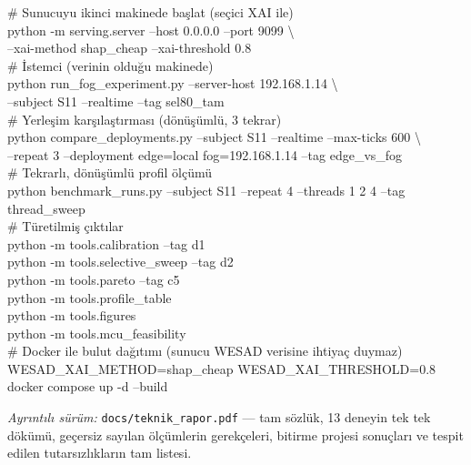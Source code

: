 \documentclass[11pt,a4paper]{article}
\newcommand{\dosya}[1]{\texttt{\footnotesize #1}}
\begin{document}
\begin{tcolorbox}[colback=acikGri,colframe=black!30,boxrule=0.6pt,breakable]
\ttfamily\footnotesize
\# Sunucuyu ikinci makinede başlat (seçici XAI ile)\\
python -m serving.server --host 0.0.0.0 --port 9099 \textbackslash\\
\hspace*{2em}--xai-method shap\_cheap --xai-threshold 0.8\\[0.4em]
\# İstemci (verinin olduğu makinede)\\
python run\_fog\_experiment.py --server-host 192.168.1.14 \textbackslash\\
\hspace*{2em}--subject S11 --realtime --tag sel80\_tam\\[0.4em]
\# Yerleşim karşılaştırması (dönüşümlü, 3 tekrar)\\
python compare\_deployments.py --subject S11 --realtime --max-ticks 600 \textbackslash\\
\hspace*{2em}--repeat 3 --deployment edge=local fog=192.168.1.14 --tag edge\_vs\_fog\\[0.4em]
\# Tekrarlı, dönüşümlü profil ölçümü\\
python benchmark\_runs.py --subject S11 --repeat 4 --threads 1 2 4 --tag thread\_sweep\\[0.4em]
\# Türetilmiş çıktılar\\
python -m tools.calibration --tag d1\\
python -m tools.selective\_sweep --tag d2\\
python -m tools.pareto --tag c5\\
python -m tools.profile\_table\\
python -m tools.figures\\
python -m tools.mcu\_feasibility\\[0.4em]
\# Docker ile bulut dağıtımı (sunucu WESAD verisine ihtiyaç duymaz)\\
WESAD\_XAI\_METHOD=shap\_cheap WESAD\_XAI\_THRESHOLD=0.8 docker compose up -d --build
\end{tcolorbox}

\vspace{0.5em}
\begin{center}\small
\textit{Ayrıntılı sürüm:} \dosya{docs/teknik\_rapor.pdf} --- tam sözlük,
13 deneyin tek tek dökümü, geçersiz sayılan ölçümlerin gerekçeleri,
bitirme projesi sonuçları ve tespit edilen tutarsızlıkların tam listesi.
\end{center}
\end{document}
